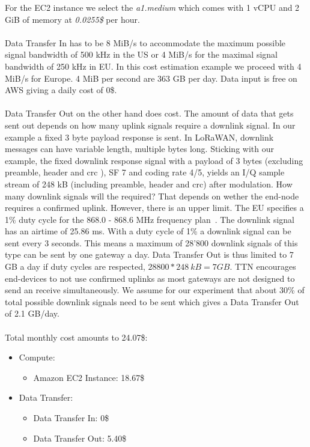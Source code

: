 For the EC2 instance we select the \emph{a1.medium} which comes with 1 vCPU and 2 GiB of memory at \emph{0.0255\$} per hour.
\\
\\
Data Transfer In has to be 8 MiB/s to accommodate the maximum possible signal bandwidth of 500 kHz in the US or 
4 MiB/s for the maximal signal bandwidth of 250 kHz in EU. In this cost estimation example we proceed with 4 MiB/s for Europe.
4 MiB per second are 363 GB per day. Data input is free on AWS  giving a daily cost of 0\$.
\\
\\
Data Transfer Out on the other hand does cost. The amount of data that gets sent out depends on
how many uplink signals require a downlink signal. In our example a fixed 3 byte payload response is sent.
In LoRaWAN, downlink messages can have variable length, multiple bytes long.
Sticking with our example, the fixed downlink response signal with a payload of 3 bytes (excluding preamble, header and crc ), SF 7 and coding rate 4/5,
yields an I/Q sample stream of 248 kB (including preamble, header and crc) after modulation.
How many downlink signals will the required? That depends on wether the end-node requires a confirmed uplink.
However, there is an upper limit. The EU specifies a 1\% duty cycle for the 868.0 - 868.6 MHz frequency plan~\cite{duty_cycle}.
The downlink signal has an airtime of 25.86 ms. With a duty cycle of 1\% a downlink signal can be sent every 3 seconds.
This means a maximum of 28'800 downlink signals of this type can be sent by one gateway a day.
Data Transfer Out is thus limited to 7 GB a day if duty cycles are respected, $28800 * 248~kB = 7 GB$.
TTN encourages end-devices to not use confirmed uplinks as most gateways are not designed to send an receive
simultaneously. We assume for our experiment that about 30\% of total possible downlink signals need to be sent
which gives a Data Transfer Out of 2.1 GB/day.
\\
\\
Total monthly cost amounts to 24.07\$:
\begin{itemize}
    \item Compute:
    \begin{itemize}
        \item  Amazon EC2 Instance: 18.67\$
    \end{itemize}
    \item  Data Transfer:
    \begin{itemize}
        \item Data Transfer In: 0\$
        \item Data Transfer Out: 5.40\$  
    \end{itemize}
\end{itemize}

